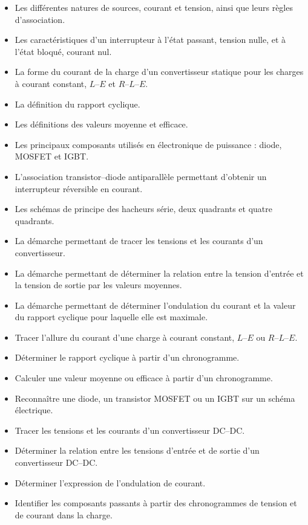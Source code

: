 
\begin{savoirs}
\begin{itemize}
\item Les différentes natures de sources, courant et tension, ainsi que leurs règles d'association.
\item Les caractéristiques d'un interrupteur à l'état passant, tension nulle, et à l'état bloqué, courant nul.
\item La forme du courant de la charge d'un convertisseur statique pour les charges à courant constant, $L$--$E$ et $R$--$L$--$E$.
\item La définition du rapport cyclique.
\item Les définitions des valeurs moyenne et efficace.
\item Les principaux composants utilisés en électronique de puissance : diode, MOSFET et IGBT.
\item L'association transistor--diode antiparallèle permettant d'obtenir un interrupteur réversible en courant.
\item Les schémas de principe des hacheurs série, deux quadrants et quatre quadrants.
\item La démarche permettant de tracer les tensions et les courants d'un convertisseur.
\item La démarche permettant de déterminer la relation entre la tension d'entrée et la tension de sortie par les valeurs moyennes.
\item La démarche permettant de déterminer l'ondulation du courant et la valeur du rapport cyclique pour laquelle elle est maximale.
\end{itemize}
\end{savoirs}

\begin{savoirfaire}
\begin{itemize}
\item Tracer l'allure du courant d'une charge à courant constant, $L$--$E$ ou $R$--$L$--$E$.
\item Déterminer le rapport cyclique à partir d'un chronogramme.
\item Calculer une valeur moyenne ou efficace à partir d'un chronogramme.
\item Reconnaître une diode, un transistor MOSFET ou un IGBT sur un schéma électrique.
\item Tracer les tensions et les courants d'un convertisseur DC--DC.
\item Déterminer la relation entre les tensions d'entrée et de sortie d'un convertisseur DC--DC.
\item Déterminer l'expression de l'ondulation de courant.
\item Identifier les composants passants à partir des chronogrammes de tension et de courant dans la charge.
\end{itemize}
\end{savoirfaire}

